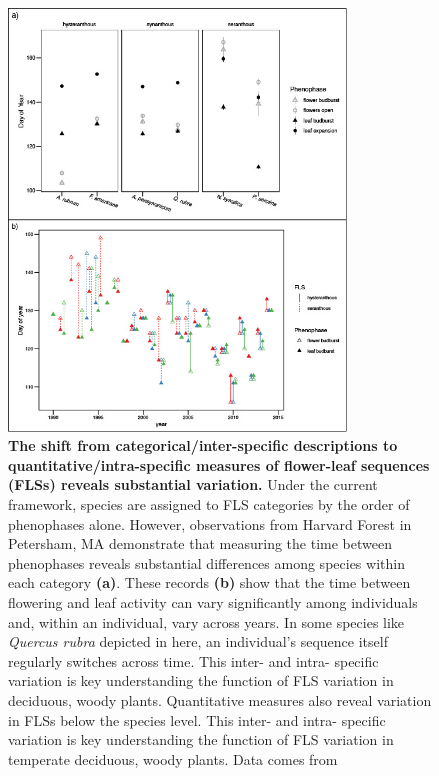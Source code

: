 \documentclass[11pt]{article}
\begin{document}
 \begin{figure}[h!]
        \centering
         \includegraphics[width=0.8\textwidth]{..//..//intraspecificplots.jpg}
          \caption{\textbf{The shift from categorical/inter-specific descriptions to quantitative/intra-specific measures of flower-leaf sequences (FLSs) reveals substantial variation.} Under the current framework, species are assigned to FLS categories by the order of phenophases alone. However, observations from Harvard Forest in Petersham, MA demonstrate that measuring the time between phenophases reveals substantial differences among species within each category \textbf{(a)}. These records \textbf{(b)} show that the time between flowering and leaf activity can vary significantly among individuals and, within an individual, vary across years. In some species like \emph{Quercus rubra} depicted in here, an individual's sequence itself regularly switches across time. This inter- and intra- specific variation is key understanding the function of FLS variation in deciduous, woody plants. Quantitative measures also reveal variation in FLSs below the species level. This inter- and intra- specific variation is key understanding the function of FLS variation in temperate deciduous, woody plants. Data comes from \citet{OKeefe2015}}
        \label{fig:vizzy}
    \end{figure}
\end{document}
